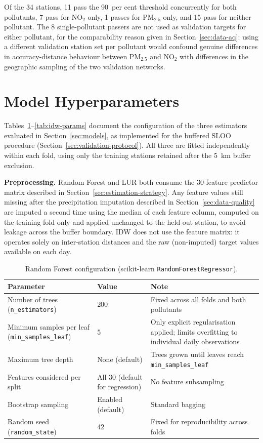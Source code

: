 \documentclass[11pt,a4paper]{article}
\let\oldsection\section
\renewcommand{\section}{\FloatBarrier\oldsection}
\begin{document}
\noindent Of the 34 stations, 11 pass the 90~per cent threshold concurrently for both pollutants, 7 pass for NO$_2$ only, 1 passes for PM$_{2.5}$ only, and 15 pass for neither pollutant. The 8 single-pollutant passers are not used as validation targets for either pollutant, for the comparability reason given in Section~\ref{sec:data-aq}: using a different validation station set per pollutant would confound genuine differences in accuracy-distance behaviour between PM$_{2.5}$ and NO$_2$ with differences in the geographic sampling of the two validation networks.

\section{Model Hyperparameters}
\label{app:model-hyperparams}

Tables~\ref{tab:rf-params}--\ref{tab:idw-params} document the configuration of the three estimators evaluated in Section~\ref{sec:models}, as implemented for the buffered SLOO procedure (Section~\ref{sec:validation-protocol}). All three are fitted independently within each fold, using only the training stations retained after the 5~km buffer exclusion.

\textbf{Preprocessing.} Random Forest and LUR both consume the 30-feature predictor matrix described in Section~\ref{sec:estimation-strategy}. Any feature values still missing after the precipitation imputation described in Section~\ref{sec:data-quality} are imputed a second time using the median of each feature column, computed on the training fold only and applied unchanged to the held-out station, to avoid leakage across the buffer boundary. IDW does not use the feature matrix: it operates solely on inter-station distances and the raw (non-imputed) target values available on each day.

\begin{table}[ht]
\centering
\caption{Random Forest configuration (scikit-learn \texttt{RandomForestRegressor}).}
\label{tab:rf-params}
\small
\begin{tabular}{p{4.5cm}p{2.5cm}p{6.5cm}}
\toprule
\textbf{Parameter} & \textbf{Value} & \textbf{Note} \\
\midrule
Number of trees (\texttt{n\_estimators}) & 200 & Fixed across all folds and both pollutants \\
Minimum samples per leaf (\texttt{min\_samples\_leaf}) & 5 & Only explicit regularisation applied; limits overfitting to individual daily observations \\
Maximum tree depth & None (default) & Trees grown until leaves reach \texttt{min\_samples\_leaf} \\
Features considered per split & All 30 (default for regression) & No feature subsampling \\
Bootstrap sampling & Enabled (default) & Standard bagging \\
Random seed (\texttt{random\_state}) & 42 & Fixed for reproducibility across folds \\
\bottomrule
\end{tabular}
\end{table}
\end{document}
